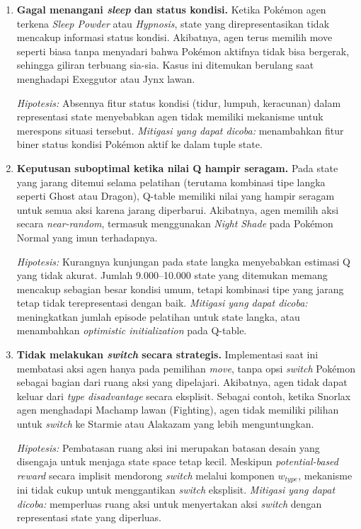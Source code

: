 \documentclass[11pt,a4paper,oneside]{report}
\begin{document}
\begin{enumerate}[leftmargin=*]
    \item \textbf{Gagal menangani \textit{sleep} dan status kondisi.} Ketika Pokémon agen terkena \textit{Sleep Powder} atau \textit{Hypnosis}, state yang direpresentasikan tidak mencakup informasi status kondisi. Akibatnya, agen terus memilih move seperti biasa tanpa menyadari bahwa Pokémon aktifnya tidak bisa bergerak, sehingga giliran terbuang sia-sia. Kasus ini ditemukan berulang saat menghadapi Exeggutor atau Jynx lawan.

    \textit{Hipotesis:} Absennya fitur status kondisi (tidur, lumpuh, keracunan) dalam representasi state menyebabkan agen tidak memiliki mekanisme untuk merespons situasi tersebut. \textit{Mitigasi yang dapat dicoba:} menambahkan fitur biner status kondisi Pokémon aktif ke dalam tuple state.

    \item \textbf{Keputusan suboptimal ketika nilai Q hampir seragam.} Pada state yang jarang ditemui selama pelatihan (terutama kombinasi tipe langka seperti Ghost atau Dragon), Q-table memiliki nilai yang hampir seragam untuk semua aksi karena jarang diperbarui. Akibatnya, agen memilih aksi secara \textit{near-random}, termasuk menggunakan \textit{Night Shade} pada Pokémon Normal yang imun terhadapnya.

    \textit{Hipotesis:} Kurangnya kunjungan pada state langka menyebabkan estimasi Q yang tidak akurat. Jumlah 9.000--10.000 state yang ditemukan memang mencakup sebagian besar kondisi umum, tetapi kombinasi tipe yang jarang tetap tidak terepresentasi dengan baik. \textit{Mitigasi yang dapat dicoba:} meningkatkan jumlah episode pelatihan untuk state langka, atau menambahkan \textit{optimistic initialization} pada Q-table.

    \item \textbf{Tidak melakukan \textit{switch} secara strategis.} Implementasi saat ini membatasi aksi agen hanya pada pemilihan \textit{move}, tanpa opsi \textit{switch} Pokémon sebagai bagian dari ruang aksi yang dipelajari. Akibatnya, agen tidak dapat keluar dari \textit{type disadvantage} secara eksplisit. Sebagai contoh, ketika Snorlax agen menghadapi Machamp lawan (Fighting), agen tidak memiliki pilihan untuk \textit{switch} ke Starmie atau Alakazam yang lebih menguntungkan.

    \textit{Hipotesis:} Pembatasan ruang aksi ini merupakan batasan desain yang disengaja untuk menjaga state space tetap kecil. Meskipun \textit{potential-based reward} secara implisit mendorong \textit{switch} melalui komponen $w_{type}$, mekanisme ini tidak cukup untuk menggantikan \textit{switch} eksplisit. \textit{Mitigasi yang dapat dicoba:} memperluas ruang aksi untuk menyertakan aksi \textit{switch} dengan representasi state yang diperluas.
\end{enumerate}
\end{document}
